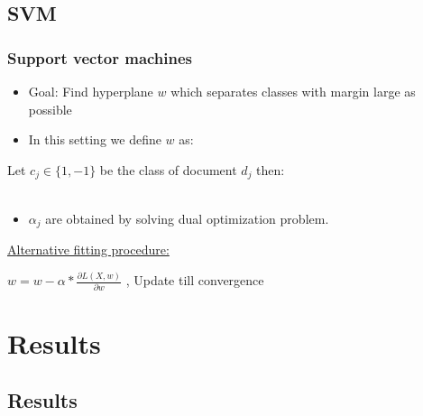 \documentclass{beamer}
\begin{document}
\subsection{SVM}
\begin{frame}
	\frametitle{Support vector machines}
	\begin{itemize}
		\item Goal: Find hyperplane $w$ which separates classes with margin large as possible \pause
		\item In this setting we define $w$ as:
	\end{itemize}
	
	\begin{Definition}
		Let $c_j \in \{1,-1\}$ be the class of document $d_j$ then: \\
		 \\
	\end{Definition}
	\begin{itemize}
		\item $\alpha_{j}$ are obtained by solving dual optimization problem.
	\end{itemize}
	\pause
	\underline{Alternative fitting procedure:}
	\\
	\begin{Definition}
		\centering
		$w = w - \alpha * \frac{\partial L(X,w)}{\partial w} $ , Update till convergence
	\end{Definition}

\end{frame}

\section{Results}
\subsection{Results}
\end{document}
